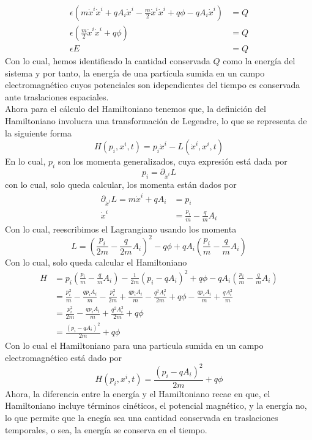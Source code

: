 \documentclass[../main.tex]{subfiles}
\begin{document}
\begin{align*}
  \epsilon\left( m{\dot{x}^i}\dot{x}^i +qA_i\dot{x}^i  - \frac{m}{2}\dot{x}^i\dot{x}^i + q\phi - qA_i\dot{x}^i\right)  & = Q \\
  \epsilon \left( \frac{m}{2}\dot{x}^i\dot{x}^i + q\phi \right) & = Q \\
  \epsilon E  & = Q
\end{align*}
Con lo cual, hemos identificado la cantidad conservada $Q$ como la energía del sistema y por tanto, la energía de una partícula sumida en un campo electromagnético cuyos potenciales son idependientes del tiempo es conservada ante traslaciones espaciales. 
 \\
 Ahora para el cálculo del Hamiltoniano tenemos que, la definición del Hamiltoniano involucra una transformación de Legendre, lo que se representa de la siguiente forma
 \begin{equation}
   H(p_i,x^i,t) = p_i\dot{x}^i - L(\dot{x}^i,x^i,t)
\end{equation}
En lo cual, $p_i$ son los momenta generalizados, cuya expresión está dada por
\begin{equation*}
  p_i=\partial_{\dot{x}^i}L
\end{equation*}
con lo cual, solo queda calcular, los momenta están dados por 
\begin{align*}
  \partial_{\dot{x}^i}L  = m\dot{x}^i + qA_i  & = p_i \\
  \dot{x}^i & = \frac{p_i}{m} - \frac{q}{m}A_i
\end{align*}
Con lo cual, reescribimos el Lagrangiano usando los momenta
\begin{equation*}
  L = \left( \frac{p_i}{2m} - \frac{q}{2m}A_i \right)^2 -q\phi + qA_i\left( \frac{p_i}{m}-\frac{q}{m}A_i \right)
\end{equation*}
Con lo cual, solo queda calcular el Hamiltoniano
\begin{align*}
  H & = p_i\left(\frac{p_i}{m} -\frac{q}{m}A_i\right) -\frac{1}{2m}\left( p_i - qA_i \right)^2 +q\phi - qA_i\left( \frac{p_i}{m}-\frac{q}{m}A_i \right) \\
  & =  \frac{p_i^2}{m} - \frac{qp_iA_i}{m} - \frac{p_i^2}{2m} + \frac{qp_iA_i}{m} - \frac{q^2A_i^2}{2m} + q\phi -  \frac{qp_iA_i}{m} + \frac{qA_i^2}{m} \\
  & = \frac{p_i^2}{2m} - \frac{qp_iA_i}{m} + \frac{q^2A_i^2}{2m} + q\phi \\
  & = \frac{(p_i - qA_i)^2}{2m} + q\phi
\end{align*}
Con lo cual el Hamiltoniano para una particula sumida en un campo electromagnético está dado por
\begin{equation}
  H(p_i,x^i,t) = \frac{(p_i-qA_i)^2}{2m} + q\phi
\end{equation}
Ahora, la diferencia entre la energía y el Hamiltoniano recae en que, el Hamiltoniano incluye términos cinéticos, el potencial magnético, y la energía no, lo que permite que la enegía sea una cantidad conservada en traslaciones temporales, o sea, la energía se conserva en el tiempo. 
 
\end{document}
